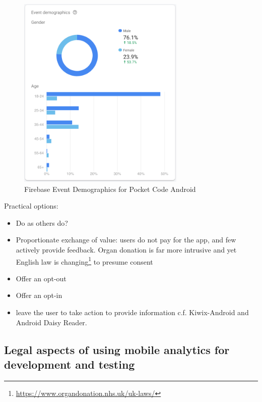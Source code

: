 \begin{figure}[htbp!]
    \centering
    \includegraphics[width=8cm]{images/firebase/Firebase-event-demographics-pocketcode-android.png}
    \caption{Firebase Event Demographics for Pocket Code Android}
    \label{fig:Firebase-event-demographics-pocketcode-android}
\end{figure}

Practical options:
\begin{itemize}
    \item Do as others do?
    \item Proportionate exchange of value: users do not pay for the app, and few actively provide feedback. Organ donation is far more intrusive and yet English law is changing\footnote{\url{https://www.organdonation.nhs.uk/uk-laws/}} to presume consent~\cite{NHS_organ_donation_in_england} 
    \item Offer an opt-out
    \item Offer an opt-in
    \item leave the user to take action to provide information c.f. Kiwix-Android and Android Daisy Reader.
\end{itemize}

\subsection{Legal aspects of using mobile analytics for development and testing}

